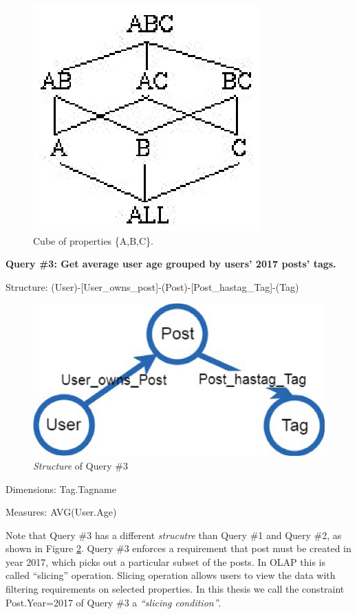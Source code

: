 \begin{figure}[H]
\centering
\includegraphics[scale=1]{pic/22.eps}
\caption{Cube of properties \{A,B,C\}.}
\label{fig:2:2}
\end{figure}

\textbf{Query \#3: 		Get average user age grouped by users’ 2017 posts’ tags.}

Structure:	(User)-[User\_owns\_post]-(Post)-[Post\_hastag\_Tag]-(Tag)
\begin{figure}[H]
\centering
\includegraphics[scale=0.5]{pic/meta2.eps}
\caption{\textit{Structure} of Query \#3}
\label{fig:2:3}
\end{figure}


Dimensions:	{Tag.Tagname}

Measures:	{AVG(User.Age)}

Note that Query \#3 has a different \textit{strucutre} than Query \#1 and Query \#2, as shown in Figure \ref{fig:2:3}. Query \#3 enforces a requirement that post must be created in year 2017, which picks out a particular subset of  the posts. In OLAP this is called ``slicing'' operation. Slicing operation allows users to view the data with filtering requirements on selected properties. In this thesis we call the constraint {Post.Year=2017}  of Query \#3 a \textit{``slicing condition''}.

